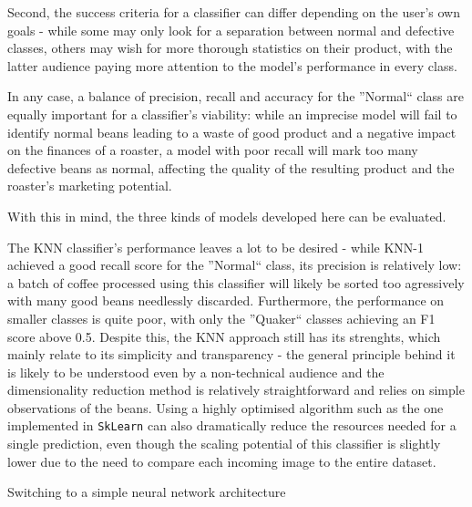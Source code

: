 Second, the success criteria for a classifier can differ depending on the user's own goals - while some may only look for
a separation between normal and defective classes, others may wish for more thorough statistics on their product, with
the latter audience paying more attention to the model's performance in every class.

In any case, a balance of precision, recall and accuracy for the ''Normal`` class are equally
important for a classifier's viability: while an imprecise model will fail to identify normal beans leading to
a waste of good product and a negative impact on the finances of a roaster, a model with poor recall will mark too many
defective beans as normal, affecting the quality of the resulting product and the roaster's marketing potential.

With this in mind, the three kinds of models developed here can be evaluated.

The KNN classifier's performance leaves a lot to be desired - while KNN-1 achieved a good recall score for the ''Normal``
class, its precision is relatively low: a batch of coffee processed using this classifier will likely be sorted too agressively
with many good beans needlessly discarded.
Furthermore, the performance on smaller classes is quite poor, with only the ''Quaker`` classes achieving an F1 score above
0.5.
Despite this, the KNN approach still has its strenghts, which mainly relate to its simplicity and transparency -
the general principle behind it is likely to be understood even by a non-technical audience and the dimensionality reduction
method is relatively straightforward and relies on simple observations of the beans.
Using a highly optimised algorithm such as the one implemented in \verb|SkLearn| can also dramatically reduce the resources
needed for a single prediction, even though the scaling potential of this classifier is slightly lower due to the need to
compare each incoming image to the entire dataset.

Switching to a simple neural network architecture



